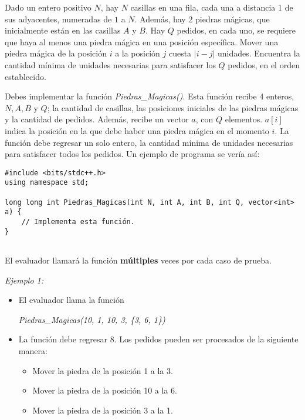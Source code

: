 \documentclass[12pt]{scrartcl}
\begin{document}

    
    \vspace{10pt}

    

        Dado un entero positivo $N$, hay $N$ casillas en una fila, cada una a distancia 1 de sus adyacentes, numeradas de $1$ a $N$. Además, hay 2 piedras mágicas, que inicialmente están en las casillas $A$ y $B$. Hay $Q$ pedidos, en cada uno, se requiere que haya al menos una piedra mágica en una posición específica. Mover una piedra mágica de la posición $i$ a la posición $j$ cuesta $\lvert i - j \lvert$ unidades. Encuentra la cantidad mínima de unidades necesarias para satisfacer los $Q$ pedidos, en el orden establecido. 
        

        Debes implementar la función \textit{Piedras\_Magicas()}. Esta función recibe 4 enteros, $N, A, B$ y $Q$; la cantidad de casillas, las posiciones iniciales de las piedras mágicas y la cantidad de pedidos. Además, recibe un vector $a$, con $Q$ elementos. $a[i]$ indica la posición en la que debe haber una piedra mágica en el momento $i$. La función debe regresar un solo entero, la cantidad mínima de unidades necesarias para satisfacer todos los pedidos. 
        Un ejemplo de programa se vería así:

\begin{verbatim}
#include <bits/stdc++.h>
using namespace std;

long long int Piedras_Magicas(int N, int A, int B, int Q, vector<int> a) {
    // Implementa esta función.
}
    
\end{verbatim}

    El evaluador llamará la función \textbf{múltiples} veces por cada caso de prueba.
    
    
        {\itshape Ejemplo 1: }
        \begin{itemize}
            \item El evaluador llama la función 
            \begin{center}
                \textit{Piedras\_Magicas(10, 1, 10, 3, \{3, 6, 1\})}
            \end{center}
            
            \item La función debe regresar $8$. Los pedidos pueden ser procesados de la siguiente manera:
            \begin{itemize}
                \item Mover la piedra de la posición 1 a la 3.
                \item Mover la piedra de la posición 10 a la 6.
                \item Mover la piedra de la posición 3 a la 1.
            \end{itemize}
        \end{itemize}
\end{document}
